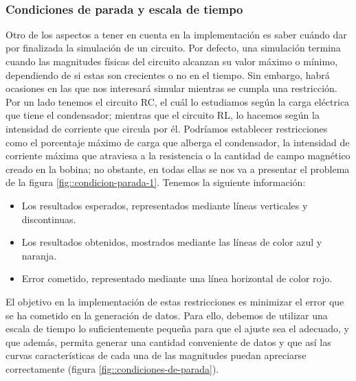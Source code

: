 \documentclass[../main.tex]{subfiles}
\begin{document}
    \hphantom{1}\\
\subsubsection{Condiciones de parada y escala de tiempo}
Otro de los aspectos a tener en cuenta en la implementación es saber cuándo dar por finalizada la simulación de un circuito. Por defecto, una simulación termina cuando las magnitudes físicas del circuito alcanzan su valor máximo o mínimo, dependiendo de si estas son crecientes o no en el tiempo. Sin embargo, habrá ocasiones en las que nos interesará simular mientras se cumpla una restricción.\\ 

Por un lado tenemos el circuito RC, el cuál lo estudiamos según la carga eléctrica que tiene el condensador; mientras que el circuito RL, lo hacemos según la intensidad de corriente que circula por él. Podríamos establecer restricciones como el porcentaje máximo de carga que alberga el condensador, la intensidad de corriente máxima que atraviesa a la resistencia o la cantidad de campo magnético creado en la bobina; no obstante, en todas ellas se nos va a presentar el problema de la figura \ref{fig::condicion-parada-1}. Tenemos la siguiente información:

\begin{itemize}
    \item Los resultados esperados, representados mediante líneas verticales y discontinuas. 
    
    \item Los resultados obtenidos, mostrados mediante las líneas de color azul y naranja.
    
    \item Error cometido, representado mediante una línea horizontal de color rojo.
\end{itemize}

El objetivo en la implementación de estas restricciones es minimizar el error que se ha cometido en la generación de datos. Para ello, debemos de utilizar una escala de tiempo lo suficientemente pequeña para que el ajuste sea el adecuado, y que además, permita generar una cantidad conveniente de datos y que así las curvas características de cada una de las magnitudes puedan apreciarse correctamente (figura \ref{fig::condiciones-de-parada}).\\ 
\end{document}
